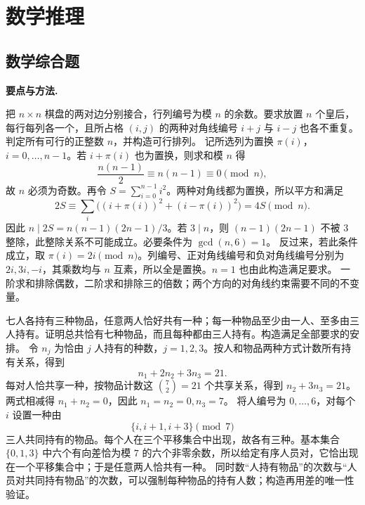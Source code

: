 \chapter{数学推理}

\section{数学综合题}
\noindent\textbf{要点与方法.}\enspace



把 $n\times n$ 棋盘的两对边分别接合，行列编号为模 $n$ 的余数。要求放置 $n$ 个皇后，每行每列各一个，且所占格 $(i,j)$ 的两种对角线编号 $i+j$ 与 $i-j$ 也各不重复。判定所有可行的正整数 $n$，并构造可行排列。
\solution 记所选列为置换 $\pi(i)$，$i=0,\ldots,n-1$。若 $i+\pi(i)$ 也为置换，则求和模 $n$ 得
\[
 \frac{n(n-1)}2\equiv n(n-1)\equiv0\pmod n,
\]
故 $n$ 必须为奇数。再令 $S=\sum_{i=0}^{n-1}i^2$。两种对角线都为置换，所以平方和满足
\[
 2S\equiv\sum_i\bigl((i+\pi(i))^2+(i-\pi(i))^2\bigr)
 =4S\pmod n.
\]
因此 $n\mid2S=n(n-1)(2n-1)/3$。若 $3\mid n$，则 $(n-1)(2n-1)$ 不被 $3$ 整除，此整除关系不可能成立。必要条件为 $\gcd(n,6)=1$。
反过来，若此条件成立，取 $\pi(i)=2i\pmod n$。列编号、正对角线编号和负对角线编号分别为 $2i,3i,-i$，其乘数均与 $n$ 互素，所以全是置换。$n=1$ 也由此构造满足要求。
\insight 一阶求和排除偶数，二阶求和排除三的倍数；两个方向的对角线约束需要不同的不变量。

七人各持有三种物品，任意两人恰好共有一种；每一种物品至少由一人、至多由三人持有。证明总共恰有七种物品，而且每种都由三人持有。构造满足全部要求的安排。
\solution 令 $n_j$ 为恰由 $j$ 人持有的种数，$j=1,2,3$。按人和物品两种方式计数所有持有关系，得到
\[
 n_1+2n_2+3n_3=21.
\]
每对人恰共享一种，按物品计数这 $\binom72=21$ 个共享关系，得到 $n_2+3n_3=21$。两式相减得 $n_1+n_2=0$，因此 $n_1=n_2=0,n_3=7$。
将人编号为 $0,\ldots,6$，对每个 $i$ 设置一种由
\[
 \{i,i+1,i+3\}\pmod7
\]
三人共同持有的物品。每个人在三个平移集合中出现，故各有三种。基本集合 $\{0,1,3\}$ 中六个有向差恰为模 $7$ 的六个非零余数，所以给定有序人员对，它恰出现在一个平移集合中；于是任意两人恰共有一种。
\insight 同时数“人持有物品”的次数与“人员对共同持有物品”的次数，可以强制每种物品的持有人数；构造再用差的唯一性验证。

